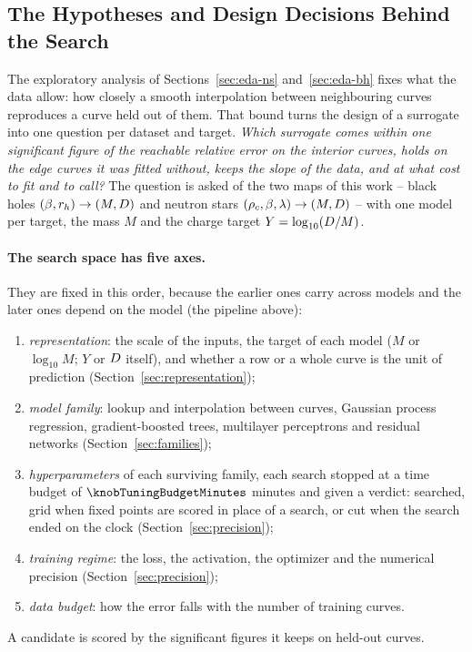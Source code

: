 \subsection{The Hypotheses and Design Decisions Behind the Search}
\label{sec:hypotheses}

The exploratory analysis of Sections~\ref{sec:eda-ns} and~\ref{sec:eda-bh} fixes what the data allow: how closely a smooth interpolation between neighbouring curves reproduces a curve held out of them. That bound turns the design of a surrogate into one question per dataset and target. \emph{Which surrogate comes within one significant figure of the reachable relative error on the interior curves, holds on the edge curves it was fitted without, keeps the slope of the data, and at what cost to fit and to call?} The question is asked of the two maps of this work -- black holes $(\beta, r_h) \to (M, D)$ and neutron stars $(\rho_c, \beta, \lambda) \to (M, D)$ -- with one model per target, the mass $M$ and the charge target $Y = \log_{10}(D/M)$.

\paragraph{The search space has five axes.}
They are fixed in this order, because the earlier ones carry across models and the later ones depend on the model (the pipeline above):
\begin{enumerate}
  \item \emph{representation}: the scale of the inputs, the target of each model ($M$ or $\log_{10} M$; $Y$ or $D$ itself), and whether a row or a whole curve is the unit of prediction (Section~\ref{sec:representation});
  \item \emph{model family}: lookup and interpolation between curves, Gaussian process regression, gradient-boosted trees, multilayer perceptrons and residual networks (Section~\ref{sec:families});
  \item \emph{hyperparameters} of each surviving family, each search stopped at a time budget of $\knobTuningBudgetMinutes$ minutes and given a verdict: searched, grid when fixed points are scored in place of a search, or cut when the search ended on the clock (Section~\ref{sec:precision});
  \item \emph{training regime}: the loss, the activation, the optimizer and the numerical precision (Section~\ref{sec:precision});
  \item \emph{data budget}: how the error falls with the number of training curves.
\end{enumerate}
A candidate is scored by the significant figures it keeps on held-out curves.

